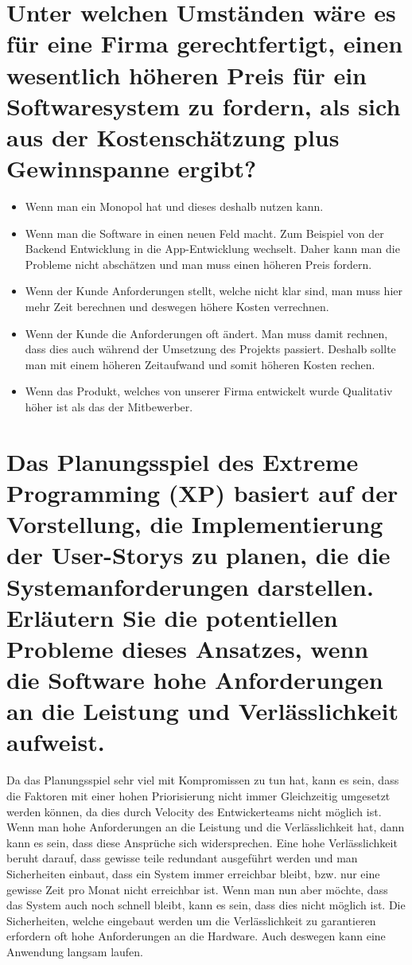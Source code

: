 \documentclass[12pt]{article}
\begin{document}
\section{Unter welchen Umständen wäre es für eine Firma gerechtfertigt, einen wesentlich höheren Preis für ein
Softwaresystem zu fordern, als sich aus der Kostenschätzung plus Gewinnspanne ergibt?}
\begin{itemize}
 \item Wenn man ein Monopol hat und dieses deshalb nutzen kann.
 \item Wenn man die Software in einen neuen Feld macht. Zum Beispiel von der Backend Entwicklung in die App-Entwicklung wechselt. Daher kann man die Probleme nicht abschätzen und man muss einen höheren Preis fordern.
 \item Wenn der Kunde Anforderungen stellt, welche nicht klar sind, man muss hier mehr Zeit berechnen und deswegen höhere Kosten verrechnen.
 \item Wenn der Kunde die Anforderungen oft ändert. Man muss damit rechnen, dass dies auch während der Umsetzung des Projekts passiert. Deshalb sollte man mit einem höheren Zeitaufwand und somit höheren Kosten rechen.
 \item Wenn das Produkt, welches von unserer Firma entwickelt wurde Qualitativ höher ist als das der Mitbewerber.
\end{itemize}
\section{Das Planungsspiel des Extreme Programming (XP) basiert auf der Vorstellung, die Implementierung der
User-Storys zu planen, die die Systemanforderungen darstellen. Erläutern Sie die potentiellen Probleme
dieses Ansatzes, wenn die Software hohe Anforderungen an die Leistung und Verlässlichkeit aufweist.}
Da das Planungsspiel sehr viel mit Kompromissen zu tun hat, kann es sein, dass die Faktoren mit einer hohen Priorisierung nicht immer Gleichzeitig umgesetzt werden können, da dies durch Velocity des Entwickerteams nicht möglich ist. Wenn man hohe Anforderungen an die Leistung und die Verlässlichkeit hat, dann kann es sein, dass diese Ansprüche sich widersprechen. Eine hohe Verlässlichkeit beruht darauf, dass gewisse teile redundant ausgeführt werden und man Sicherheiten einbaut, dass ein System immer erreichbar bleibt, bzw. nur eine gewisse Zeit pro Monat nicht erreichbar ist. Wenn man nun aber möchte, dass das System auch noch schnell bleibt, kann es sein, dass dies nicht möglich ist. Die Sicherheiten, welche eingebaut werden um die Verlässlichkeit zu garantieren erfordern oft hohe Anforderungen an die Hardware. Auch deswegen kann eine Anwendung langsam laufen.
\end{document}
